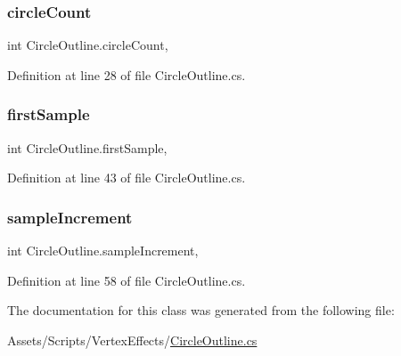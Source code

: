 \subsubsection{\texorpdfstring{circle\+Count}{circleCount}}
{\footnotesize\ttfamily int Circle\+Outline.\+circle\+Count\hspace{0.3cm}{\ttfamily [get]}, {\ttfamily [set]}}



Definition at line 28 of file Circle\+Outline.\+cs.

\mbox{\label{class_circle_outline_aadda26b329945bc2a1fb1d96cf0e7515}} 
\subsubsection{\texorpdfstring{first\+Sample}{firstSample}}
{\footnotesize\ttfamily int Circle\+Outline.\+first\+Sample\hspace{0.3cm}{\ttfamily [get]}, {\ttfamily [set]}}



Definition at line 43 of file Circle\+Outline.\+cs.

\mbox{\label{class_circle_outline_a3b50a97b874f55d06e09c2a96e3ca121}} 
\subsubsection{\texorpdfstring{sample\+Increment}{sampleIncrement}}
{\footnotesize\ttfamily int Circle\+Outline.\+sample\+Increment\hspace{0.3cm}{\ttfamily [get]}, {\ttfamily [set]}}



Definition at line 58 of file Circle\+Outline.\+cs.



The documentation for this class was generated from the following file\+:\begin{DoxyCompactItemize}
\item 
Assets/\+Scripts/\+Vertex\+Effects/\mbox{\hyperlink{_circle_outline_8cs}{Circle\+Outline.\+cs}}\end{DoxyCompactItemize}
